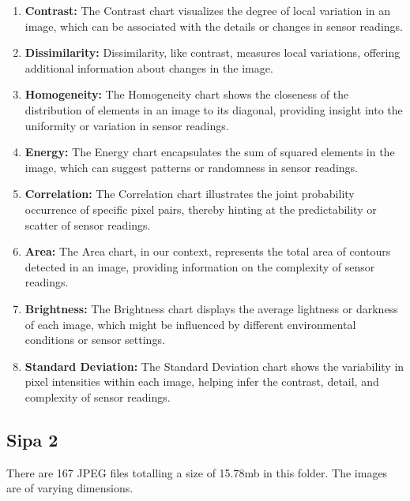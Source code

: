 \begin{enumerate}
\begin{enumerate}
              \item \textbf{Contrast:} The Contrast chart visualizes the degree of local variation in an image, which can be associated with the details or changes in sensor readings.
              \item \textbf{Dissimilarity:} Dissimilarity, like contrast, measures local variations, offering additional information about changes in the image.
              \item \textbf{Homogeneity:} The Homogeneity chart shows the closeness of the distribution of elements in an image to its diagonal, providing insight into the uniformity or variation in sensor readings.
              \item \textbf{Energy:} The Energy chart encapsulates the sum of squared elements in the image, which can suggest patterns or randomness in sensor readings.
              \item \textbf{Correlation:} The Correlation chart illustrates the joint probability occurrence of specific pixel pairs, thereby hinting at the predictability or scatter of sensor readings.
              \item \textbf{Area:} The Area chart, in our context, represents the total area of contours detected in an image, providing information on the complexity of sensor readings.
              \item \textbf{Brightness:} The Brightness chart displays the average lightness or darkness of each image, which might be influenced by different environmental conditions or sensor settings.
              \item \textbf{Standard Deviation:} The Standard Deviation chart shows the variability in pixel intensities within each image, helping infer the contrast, detail, and complexity of sensor readings.
          \end{enumerate}


\end{enumerate}

\newpage

\subsection{Sipa 2}

There are 167 JPEG files totalling a size of 15.78mb in this folder. The images are of varying dimensions.

